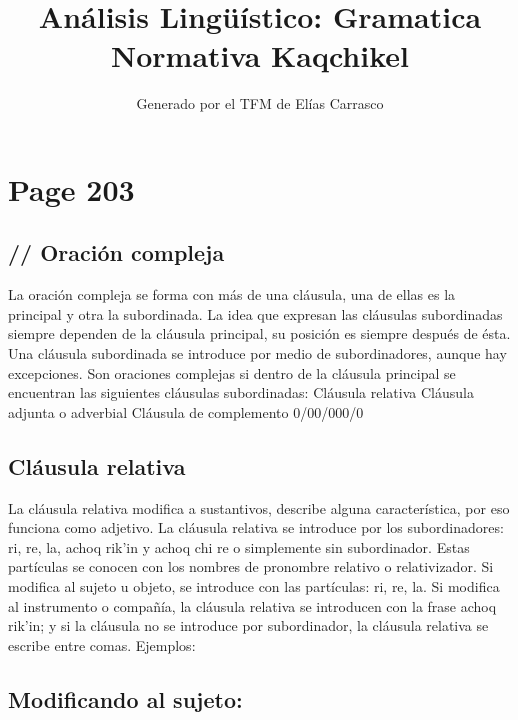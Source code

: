 \documentclass{article}%
\title{Análisis Lingüístico: Gramatica Normativa Kaqchikel}%
\author{Generado por el TFM de Elías Carrasco}%
\begin{document}
%
\normalsize%
\maketitle%
\section{Page 203}%
\label{sec:Page203}%
\subsection{// Oración compleja}%
\label{subsec://Oracincompleja}%

%
La oración compleja se forma con más de una cláusula, una de ellas es la principal y %
otra la subordinada. La idea que expresan las cláusulas subordinadas siempre dependen %
de la cláusula principal, su posición es siempre después de ésta. Una cláusula subordinada %
se introduce por medio de subordinadores, aunque hay excepciones. Son oraciones %
complejas si dentro de la cláusula principal se encuentran las siguientes cláusulas %
subordinadas: %
Cláusula relativa %
Cláusula adjunta o adverbial %
Cláusula de complemento %
0/00/000/0 %
\subsection{Cláusula relativa}%
\label{subsec:Clusularelativa}%

%
La cláusula relativa modifica a sustantivos, describe alguna característica, por eso %
funciona como adjetivo. La cláusula relativa se introduce por los subordinadores: ri, %
re, la, achoq rik'in y achoq chi re o simplemente sin subordinador. Estas partículas se %
conocen con los nombres de pronombre relativo o relativizador. Si modifica al sujeto u %
objeto, se introduce con las partículas: ri, re, la. Si modifica al instrumento o compañía, %
la cláusula relativa se introducen con la frase achoq rik'in; y si la cláusula no se %
introduce por subordinador, la cláusula relativa se escribe entre comas. Ejemplos: %
\subsection{Modificando al sujeto:}%
\label{subsec:Modificandoalsujeto}%
\end{document}
